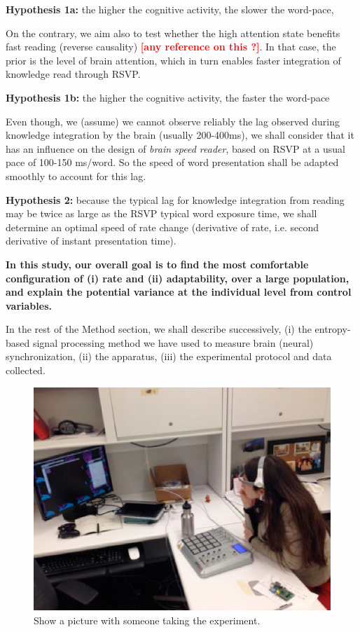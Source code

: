 {\bf Hypothesis 1a: }  the higher the cognitive activity, the slower the word-pace, 

On the contrary, we aim also to test whether the high attention state benefits fast reading (reverse causality) \textcolor{red}{\bf [any reference on this ?]}. In that case, the prior is the level of brain attention, which in turn enables faster integration of knowledge read through RSVP.

{\bf Hypothesis 1b:} the higher the cognitive activity, the faster the word-pace

Even though, we (assume) we cannot observe reliably the lag observed during knowledge integration by the brain (usually 200-400ms), we shall consider that it has an influence on the design of {\it brain speed reader}, based on RSVP at a usual pace of 100-150 ms/word. So the speed of word presentation shall be adapted smoothly to account for this lag.

{\bf Hypothesis 2:} because the typical lag for knowledge integration from reading may be twice as large as the RSVP typical word exposure time, we shall determine an optimal speed of rate change (derivative of rate, i.e. second derivative of instant presentation time).

{\bf In this study, our overall goal is to find the most comfortable configuration of (i) rate and (ii) adaptability, over a large population, and explain the potential variance at the individual level from control variables.}

In the rest of the Method section, we shall describe successively, (i) the entropy-based signal processing method we have used to measure brain (neural) synchronization, (ii) the apparatus, (iii) the experimental protocol and data collected.





\begin{figure}[!t]
\centering
\includegraphics[width=0.9\columnwidth]{../figures/ariel.eps}
\caption{Show a picture with someone taking the experiment.}
\label{fig:ariel}
\end{figure}



